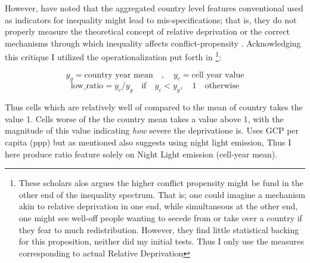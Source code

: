 \documentclass[a4paper]{article}
\begin{document}

However, \cite{Cederman_Gleditsch_2009,Cederman_Gleditsch_Buhaug_2013} have noted that the aggregated country level features conventional used as indicators for inequality might lead to mis-specifications; that is, they do not properly measure the theoretical concept of relative deprivation or the correct mechanisms through which inequality affects conflict-propensity \citep[XX]{Cederman_Gleditsch_Buhaug_2013}. Acknowledging this critique I utilized the operationalization put forth in \cite[p. 104-105]{Cederman_Gleditsch_Buhaug_2013}\footnote{These scholars alos argues the higher conflict propensity might be fund in the other end of the inequality spectrum. That is; one could imagine a mechanism akin to relative deprivation in one end, while simultaneous at the other end, one might see well-off people wanting to secede from or take over a country if they fear to much redistribution. However, they find little statistical backing for this proposition, neither did my initial tests. Thus I only use the measures corresponding to actual Relative Deprivation}:\par

$$y_g = \textrm{country year mean}\quad ,\quad  y_c = \textrm{cell year value}$$
$$\textrm{low\_ratio} = y_c/y_g  \quad \textrm{if} \quad y_c < y_g, \quad 1 \quad \textrm{otherwise}$$

Thus cells which are relatively well of compared to the mean of country takes the value 1. Cells worse of the the country mean takes a value above 1, with the magnitude of this value indicating \emph{how} severe the deprivatione is. \cite{Cederman_Gleditsch_Buhaug_2013} Uses GCP per capita (ppp) but as mentioned also suggests using night light emission, Thus I here produce ratio feature solely on Night Light emission (cell-year mean).\par
\end{document}

